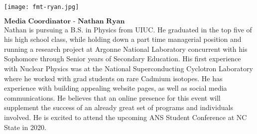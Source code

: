 \begin{minipage}{0.25\textwidth}
	\centering
	\texttt{[image: fmt-ryan.jpg]}
\end{minipage}
\begin{minipage}{0.73\textwidth}
$\textbf{Media Coordinator - Nathan Ryan}$\\
	Nathan is pursuing a B.S. in Physics from UIUC. He graduated in the top five of his high school class, while holding down a part time managerial position and running a research project at Argonne National Laboratory concurrent with his Sophomore through Senior years of Secondary Education. His first experience with Nuclear Physics was at the National Superconducting Cyclotron Laboratory where he worked with grad students on rare Cadmium isotopes. He has experience with building appealing website pages, as well as social media communications. He believes that an online presence for this event will supplement the success of an already great set of programs and individuals involved. He is excited to attend the upcoming ANS Student Conference at NC State in 2020.
\end{minipage}
